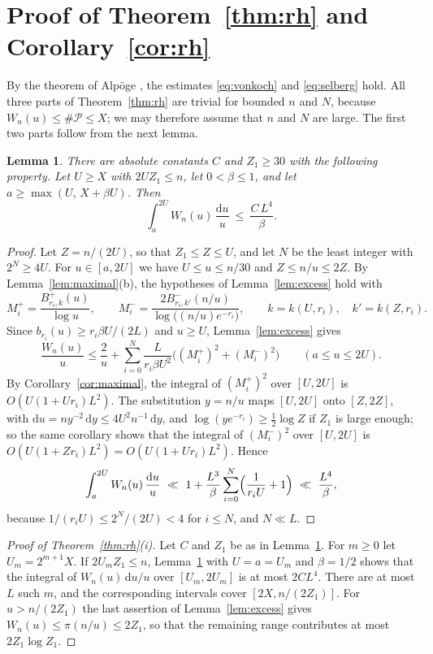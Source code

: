 \documentclass[11pt,reqno]{amsart}
\newtheorem{lemma}[theorem]{Lemma}
\theoremstyle{definition}
\theoremstyle{remark}
\numberwithin{equation}{section}
\newcommand{\dd}{\mathrm{d}}
\newcommand{\cP}{\mathcal{P}}
\begin{document}
\section{\texorpdfstring{Proof of Theorem~\ref{thm:rh} and Corollary~\ref{cor:rh}}{Proof of Theorem 1.2 and Corollary 1.3}}\label{sec:proofs}

By the theorem of Alp\"oge \cite{Al}, the estimates \eqref{eq:vonkoch} and \eqref{eq:selberg} hold. All three parts of Theorem~\ref{thm:rh} are trivial for bounded $n$ and $N$, because $W_n(u)\le\#\cP\le X$; we may therefore assume that $n$ and $N$ are large. The first two parts follow from the next lemma.

\begin{lemma}\label{lem:block}
There are absolute constants $C$ and $Z_1\ge30$ with the following property. Let $U\ge X$ with $2UZ_1\le n$, let $0<\beta\le1$, and let $a\ge\max(U,\,X+\beta U)$. Then
\[
 \int_a^{2U}W_n(u)\,\frac{\dd u}{u}\ \le\ \frac{C\,L^4}{\beta}.
\]
\end{lemma}

\begin{proof}
Let $Z=n/(2U)$, so that $Z_1\le Z\le U$, and let $N$ be the least integer with $2^N\ge4U$. For $u\in[a,2U]$ we have $U\le u\le n/30$ and $Z\le n/u\le2Z$. By Lemma~\ref{lem:maximal}(b), the hypotheses of Lemma~\ref{lem:excess} hold with
\[
 M_i^+=\frac{B^+_{r_i,k}(u)}{\log u},\qquad M_i^-=\frac{2B^-_{r_i,k'}(n/u)}{\log\bigl((n/u)e^{-r_i}\bigr)},\qquad k=k(U,r_i),\quad k'=k(Z,r_i).
\]
Since $b_{r_i}(u)\ge r_i\beta U/(2L)$ and $u\ge U$, Lemma~\ref{lem:excess} gives
\[
 \frac{W_n(u)}{u}\le\frac2u+\sum_{i=0}^N\frac{L}{r_i\beta U^2}\bigl((M_i^+)^2+(M_i^-)^2\bigr)\qquad(a\le u\le2U).
\]
By Corollary~\ref{cor:maximal}, the integral of $(M_i^+)^2$ over $[U,2U]$ is $O(U(1+Ur_i)L^2)$. The substitution $y=n/u$ maps $[U,2U]$ onto $[Z,2Z]$, with $\dd u=ny^{-2}\,\dd y\le4U^2n^{-1}\,\dd y$, and $\log(ye^{-r_i})\ge\frac12\log Z$ if $Z_1$ is large enough; so the same corollary shows that the integral of $(M_i^-)^2$ over $[U,2U]$ is $O(U(1+Zr_i)L^2)=O(U(1+Ur_i)L^2)$. Hence
\[
 \int_a^{2U}W_n(u)\,\frac{\dd u}{u}\ \ll\ 1+\frac{L^3}{\beta}\sum_{i=0}^N\Bigl(\frac1{r_iU}+1\Bigr)\ \ll\ \frac{L^4}{\beta},
\]
because $1/(r_iU)\le2^N/(2U)<4$ for $i\le N$, and $N\ll L$.
\end{proof}

\begin{proof}[Proof of Theorem~\ref{thm:rh}\textup{(i)}]
Let $C$ and $Z_1$ be as in Lemma~\ref{lem:block}. For $m\ge0$ let $U_m=2^{m+1}X$. If $2U_mZ_1\le n$, Lemma~\ref{lem:block} with $U=a=U_m$ and $\beta=1/2$ shows that the integral of $W_n(u)\,\dd u/u$ over $[U_m,2U_m]$ is at most $2CL^4$. There are at most $L$ such $m$, and the corresponding intervals cover $[2X,n/(2Z_1)]$. For $u>n/(2Z_1)$ the last assertion of Lemma~\ref{lem:excess} gives $W_n(u)\le\pi(n/u)\le2Z_1$, so that the remaining range contributes at most $2Z_1\log Z_1$.
\end{proof}
\end{document}
